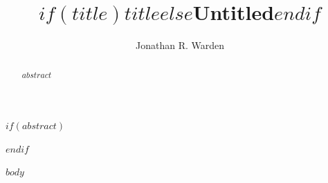 \documentclass[sigplan,review,nonacm]{acmart}
\title{$if(title)$$title$$else$Untitled$endif$}
\author{Jonathan R. Warden}
\affiliation{%
  \institution{}
  \city{}
  \country{}
}
\begin{document}
$if(abstract)$
\begin{abstract}
\sloppy
$abstract$
\end{abstract}
$endif$

\maketitle

$body$
\end{document}

